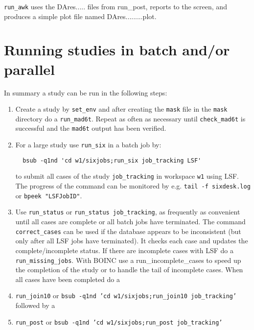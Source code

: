 \documentclass{cernatsnote}    %
\begin{document}
{\tt run\_awk} uses the DAres..... files from run\_post, reports to the screen,
and produces a simple plot file named DAres.........plot.

\section{Running studies in batch and/or parallel}
In summary a study can be run in the following steps:
\begin{enumerate}
\item Create a study by {\tt set\_env} and after creating the
{\tt mask} file in the {\tt mask} directory do a {\tt run\_mad6t}.
Repeat as often as necessary until {\tt check\_mad6t} is successful
and the {\tt mad6t} output has been verified.
\item For a large study use {\tt run\_six} in a batch job by:
\begin{verbatim}
  bsub -q1nd 'cd w1/sixjobs;run_six job_tracking LSF' 
\end{verbatim}
to submit all cases of the study {\tt job\_tracking} in workspace {\tt w1} using LSF.
The progress of the command can be monitored by
e.g. {\tt tail -f sixdesk.log} or {\tt bpeek "LSFJobID"}. 
\item Use {\tt run\_status} or {\tt run\_status job\_tracking}, as frequently 
as convenient until all cases are complete or all batch jobs have terminated.
The command {\tt correct\_cases} can be used if the database appears to be
inconsistent (but only after all LSF jobs have terminated). It checks each case and updates 
the complete/incomplete status. 
If there are incomplete cases with LSF do a {\tt run\_missing\_jobs}. With BOINC use
a run\_incomplete\_cases to speed up the completion of the study or to handle the tail
of incomplete cases. When all cases have been completed do a
\item {\tt run\_join10} or {\tt bsub -q1nd 'cd w1/sixjobs;run\_join10 job\_tracking'} 
followed by a
\item {\tt run\_post} or {\tt bsub -q1nd 'cd w1/sixjobs;run\_post job\_tracking'}
\end{enumerate}
\end{document}
